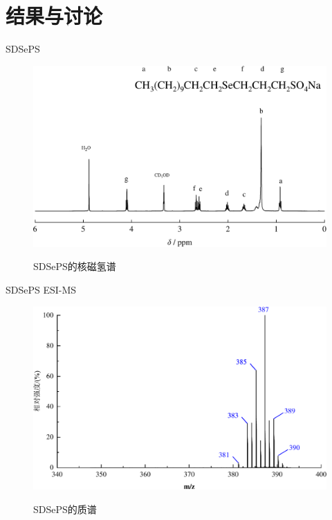 \documentclass[10pt,aspectratio=43,mathserif]{beamer}
\begin{document}
\section[结果]{结果与讨论}
    \begin{frame}{SDSePS }
        \begin{figure}[htbp]
            \centering
            \includegraphics[width=.85\textwidth]{figure/SDSePS-nmr.pdf}\\
            \caption{SDSePS的核磁氢谱}\label{fig:SDSePS-nmr}
        \end{figure}
    \end{frame}

    \begin{frame}{SDSePS ESI-MS}
    \begin{figure}[htbp]
        \centering
        \includegraphics[width=.7\textwidth]{figure/SDSePS-mass.pdf}\\
        \caption{SDSePS的质谱}\label{fig:SDSePS-mass}
    \end{figure}
    \end{frame}
\end{document}

